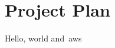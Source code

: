 
\thispagestyle{plain}
\newpage
\section{Project Plan}\label{sec:project-plan}

\normalsize
Hello, world and~\gls{aws} ~\citep{cc_overview}